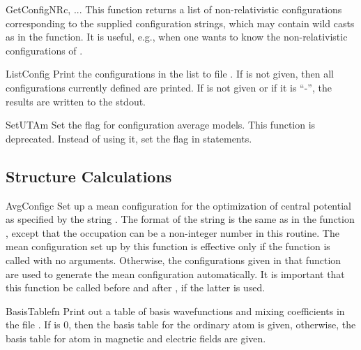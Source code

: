 \begin{fundesc}{GetConfigNR}{c, ...}
This function returns a list of non-relativistic configurations corresponding
to the supplied configuration strings, which may contain wild casts as in the
 function. It is useful, e.g., when one wants to know the
non-relativistic configurations of .
\end{fundesc}

\begin{fundesc}{ListConfig}{}
Print the configurations in the list  to file . If  is not
given, then all configurations currently defined are printed. If  is not
given or if it is ``-'', the results are written to the stdout.
\end{fundesc}

\begin{fundesc}{SetUTA}{m}
Set the flag for configuration average models. This function is deprecated.
Instead of using it, set the  flag in  statements.
\end{fundesc}

\subsection{Structure Calculations}

\begin{fundesc}{AvgConfig}{c}
Set up a mean configuration for the optimization of central potential as
specified by the string . The format of the string is the same as in the
function , except that the occupation can be a non-integer
number in this routine. The mean configuration set up by this function is
effective only if the function  is called with no
arguments. Otherwise, the configurations given in that function are used to
generate the mean configuration automatically. It is important that this
function be called before  and after
, if the latter is used.
\end{fundesc}

\begin{fundesc}{BasisTable}{fn}
Print out a table of basis wavefunctions and mixing coefficients in the file
. If  is 0, then the basis table for the ordinary atom is
given, otherwise, the basis table for atom in magnetic and electric fields are
given.
\end{fundesc}


